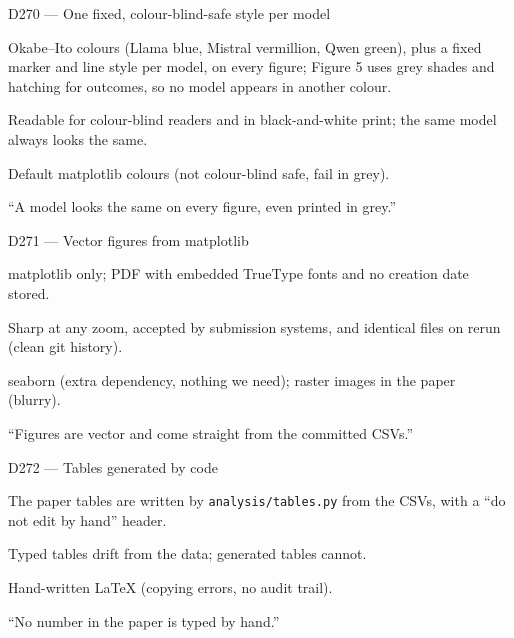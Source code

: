 \documentclass[11pt,a4paper]{report}
\begin{document}
\begin{decisionbox}{D270 --- One fixed, colour-blind-safe style per model}
\begin{description}[nosep, leftmargin=0pt]
  \item[Decision.] Okabe--Ito colours (Llama blue, Mistral vermillion, Qwen green), plus a fixed marker and line style per model, on every figure; Figure 5 uses grey shades and hatching for outcomes, so no model appears in another colour.
  \item[Why.] Readable for colour-blind readers and in black-and-white print; the same model always looks the same.
  \item[Alternatives.] Default matplotlib colours (not colour-blind safe, fail in grey).
  \item[Interview line.] ``A model looks the same on every figure, even printed in grey.''
\end{description}
\end{decisionbox}

\begin{decisionbox}{D271 --- Vector figures from matplotlib}
\begin{description}[nosep, leftmargin=0pt]
  \item[Decision.] matplotlib only; PDF with embedded TrueType fonts and no creation date stored.
  \item[Why.] Sharp at any zoom, accepted by submission systems, and identical files on rerun (clean git history).
  \item[Alternatives.] seaborn (extra dependency, nothing we need); raster images in the paper (blurry).
  \item[Interview line.] ``Figures are vector and come straight from the committed CSVs.''
\end{description}
\end{decisionbox}

\begin{decisionbox}{D272 --- Tables generated by code}
\begin{description}[nosep, leftmargin=0pt]
  \item[Decision.] The paper tables are written by \texttt{analysis/tables.py} from the CSVs, with a ``do not edit by hand'' header.
  \item[Why.] Typed tables drift from the data; generated tables cannot.
  \item[Alternatives.] Hand-written \LaTeX{} (copying errors, no audit trail).
  \item[Interview line.] ``No number in the paper is typed by hand.''
\end{description}
\end{decisionbox}
\end{document}
